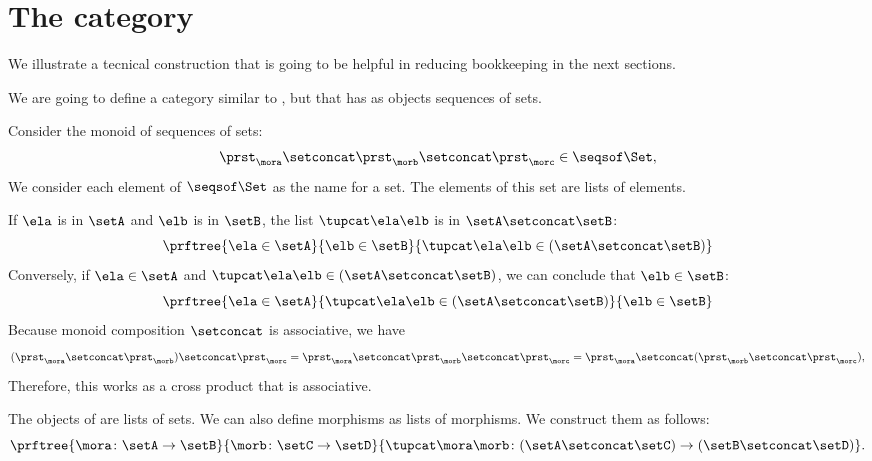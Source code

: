 \section{The \SetStar category}
\label{sec:SetStar}

We illustrate a tecnical construction that is going to be helpful in reducing bookkeeping in the next sections.

We are going to define a category similar to \Set, but that has as objects sequences of sets.

Consider the monoid of sequences of sets:
%
\begin{equation}
    \label{eq:sets-monoid}
    \prst_{\mora} \setconcat \prst_{\morb} \setconcat \prst_{\morc} \in \seqsof\Set,
\end{equation}
%
We consider each element of $\seqsof\Set$ as the name for a set.
The elements of this set are lists of elements.

If $\ela$ is in $\setA$ and $\elb$ is in $\setB$, the list $\tupcat \ela \elb$ is in $\setA \setconcat \setB$:
%
\begin{equation}
    \label{eq:sets-monoid-axiom1}
    \prftree{\ela \in \setA}{\elb \in \setB}{ \tupcat \ela \elb \in (\setA \setconcat \setB) }
\end{equation}
%
Conversely, if $\ela \in \setA$ and $\tupcat \ela \elb \in (\setA \setconcat \setB)$, we can conclude that $\elb \in \setB$:
%
\begin{equation}
    \label{eq:sets-monoid-axiom2}
    \prftree{\ela \in \setA}{ \tupcat \ela \elb \in (\setA \setconcat \setB) }{  \elb \in  \setB }
\end{equation}
%
Because monoid composition $\setconcat$ is associative, we have
%
\begin{equation}
    \label{eq:sets-monoid-comp}
    (\prst_{\mora} \setconcat \prst_{\morb} )\setconcat \prst_{\morc} =
    \prst_{\mora} \setconcat \prst_{\morb} \setconcat \prst_{\morc} =
    \prst_{\mora} \setconcat (\prst_{\morb} \setconcat \prst_{\morc}),
\end{equation}
%
Therefore, this works as a cross product that is associative.

The objects of \SetStar are lists of sets.
We can also define morphisms as lists of morphisms.
We construct them as follows:
%
\begin{equation}
    \label{eq:sets-monoid-maps2}
    \prftree{ \mora \colon \setA \to \setB}{ \morb \colon \setC \to \setD}{ \tupcat \mora \morb \colon (\setA \setconcat \setC)\to (\setB \setconcat \setD)}.
\end{equation}
%

